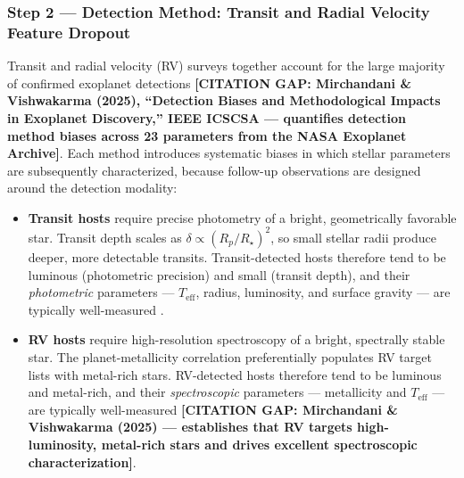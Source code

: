\documentclass[preprint]{aastex631}
\begin{document}
\subsubsection*{Step 2 --- Detection Method: Transit and Radial Velocity Feature Dropout}

Transit and radial velocity (RV) surveys together account for the large majority of confirmed exoplanet detections \textbf{[CITATION GAP: Mirchandani \& Vishwakarma (2025), ``Detection Biases and Methodological Impacts in Exoplanet Discovery,'' IEEE ICSCSA --- quantifies detection method biases across 23 parameters from the NASA Exoplanet Archive]}. Each method introduces systematic biases in which stellar parameters are subsequently characterized, because follow-up observations are designed around the detection modality:

\begin{itemize}
  \item \textbf{Transit hosts} require precise photometry of a bright, geometrically favorable star. Transit depth scales as $\delta \propto (R_p/R_\star)^2$, so small stellar radii produce deeper, more detectable transits. Transit-detected hosts therefore tend to be luminous (photometric precision) and small (transit depth), and their \emph{photometric} parameters --- $T_{\mathrm{eff}}$, radius, luminosity, and surface gravity --- are typically well-measured \citep{burkeTERRESTRIALPLANETOCCURRENCE2015}.

  \item \textbf{RV hosts} require high-resolution spectroscopy of a bright, spectrally stable star. The planet-metallicity correlation preferentially populates RV target lists with metal-rich stars. RV-detected hosts therefore tend to be luminous and metal-rich, and their \emph{spectroscopic} parameters --- metallicity and $T_{\mathrm{eff}}$ --- are typically well-measured \textbf{[CITATION GAP: Mirchandani \& Vishwakarma (2025) --- establishes that RV targets high-luminosity, metal-rich stars and drives excellent spectroscopic characterization]}.
\end{itemize}
\end{document}
